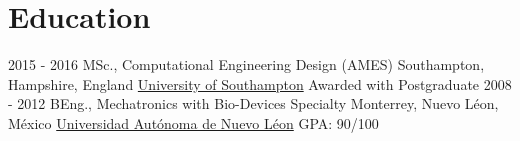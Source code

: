 \documentclass[a4paper]{twentysecondcv} %
\begin{document}
\makeprofile %

\section{Education}

\begin{twenty} %
	\twentyitem
    	{2015 - 2016}
        {MSc., Computational Engineering Design (AMES)}
        {Southampton, Hampshire, England}
        {\href{http://www.southampton.ac.uk/}{University of Southampton}}
        {Awarded with Postgraduate}
	\twentyitem
    	{2008 - 2012}
        {BEng., Mechatronics with Bio-Devices Specialty}        
        {Monterrey, Nuevo L\'eon, M\'exico}
        {\href{http://www.uanl.mx/en}{Universidad Aut\'onoma de Nuevo L\'eon}}
        {GPA: 90/100}
\end{twenty}



\end{document}
